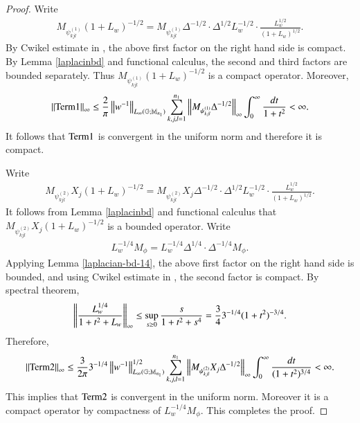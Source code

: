\documentclass[leqno]{amsart}
\begin{document}
\begin{proof}
		Write
		\begin{align*}
			M_{\psi_{kjl}^{(1)}}(1+L_{w})^{-1/2}
			=M_{\psi_{kjl}^{(1)}}\Delta^{-1/2}\cdot \Delta^{1/2}L_{w}^{-1/2}\cdot \frac{L_{w}^{1/2}}{(1+L_{w})^{1/2}}.
		\end{align*}
		By Cwikel estimate in \cite{MSZ-Cwikel}, the above first factor on the right hand side is compact.
		By Lemma \ref{laplacinbd} and functional calculus, the second and third factors are bounded separately.
		Thus $M_{\psi_{kjl}^{(1)}}(1+L_{w})^{-1/2}$ is a compact operator.
		Moreover,
		\begin{align*}
			\left\| {\rm Term1} \right\|_{\infty}
			\leq\frac{2}{\pi}\left\| w^{-1} \right\|_{L_{\infty}(\mathbb{G};\mathbb{M}_{n_{1}})}\sum_{k,j,l=1}^{n_{1}}\left\| M_{\psi_{kjl}^{(1)}}\Delta^{-1/2} \right\|_{\infty}
			\int_{0}^{\infty}\frac{dt}{1+t^{2}}<\infty.
		\end{align*}
		It follows that ${\rm Term1}$ is convergent in the uniform norm and therefore it is compact.
		
		Write
		\begin{align*}
			M_{\psi_{kjl}^{(2)}}X_{j}(1+L_{w})^{-1/2}
			=M_{\psi_{kjl}^{(2)}}X_{j}\Delta^{-1/2}\cdot\Delta^{1/2}L_{w}^{-1/2}\cdot \frac{L_{w}^{1/2}}{(1+L_{w})^{1/2}}.
		\end{align*}
		It follows from Lemma \ref{laplacinbd} and functional calculus that $M_{\psi_{kjl}^{(2)}}X_{j}(1+L_{w})^{-1/2}$ is a bounded operator.
		Write
		\begin{align}\label{L14-compact}
			L_{w}^{-1/4}M_{\phi}=L_{w}^{-1/4}\Delta^{1/4}\cdot \Delta^{-1/4}M_{\phi}.
		\end{align}
		Applying Lemma \ref{laplacian-bd-14}, the above first factor on the right hand side is bounded,
		and using Cwikel estimate in \cite{MSZ-Cwikel}, the second factor is compact.
		By spectral theorem,
		\begin{align}\label{LL-spectral}
			\left\| \frac{L_{w}^{1/4}}{1+t^{2}+L_{w}} \right\|_{\infty}
			\leq\sup_{s\geq0}\frac{s}{1+t^{2}+s^{4}}
			=\frac{3}{4}3^{-1/4}(1+t^{2})^{-3/4}.
		\end{align}
		Therefore,
		\begin{align*}
			\left\| {\rm Term2} \right\|_{\infty}
			\leq\frac{3}{2\pi}3^{-1/4}\left\| w^{-1} \right\|_{L_{\infty}(\mathbb{G};\mathbb{M}_{n_{1}})}^{1/2}
			\sum_{k,j,l=1}^{n_{1}}\left\| M_{\psi_{kjl}^{(2)}}X_{j}\Delta^{-1/2} \right\|_{\infty}
			\int_{0}^{\infty}\frac{dt}{(1+t^{2})^{3/4}}<\infty.
		\end{align*}
		This implies that ${\rm Term2}$ is convergent in the uniform norm. Moreover it is a compact operator by compactness of $L_{w}^{-1/4}M_{\phi}$.
		This completes the proof.
		
	\end{proof}
	
\end{document}
